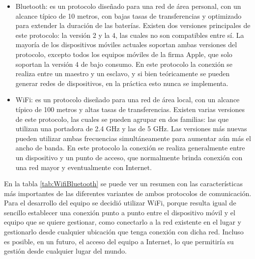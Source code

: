 \begin{itemize}
	\item Bluetooth: es un protocolo diseñado para una red de área personal, con un alcance típico de 10 metros, con bajas tasas de transferencias y optimizado para extender la duración de las baterías\cite{noauthor_bluetooth_2020}. Existen dos versiones principales de este protocolo: la versión 2 y la 4, las cuales no son compatibles entre sí. La mayoría de los dispositivos móviles actuales soportan ambas versiones del protocolo, excepto todos los equipos móviles de la firma Apple, que solo soportan la versión 4 de bajo consumo. En este protocolo la conexión se realiza entre un maestro y un esclavo, y si bien teóricamente se pueden generar redes de dispositivos, en la práctica esto nunca se implementa.
	
	\item WiFi: es un protocolo diseñado para una red de área local, con un alcance típico de 100 metros y altas tasas de transferencias\cite{noauthor_wifi_2020}. Existen varias versiones de este protocolo, las cuales se pueden agrupar en dos familias: las que utilizan una portadora de 2.4 GHz y las de 5 GHz. Las versiones más nuevas pueden utilizar ambas frecuencias simultáneamente para aumentar aún más el ancho de banda. En este protocolo la conexión se realiza generalmente entre un dispositivo y un punto de acceso, que normalmente brinda conexión con una red mayor y eventualmente con Internet.
\end{itemize}

En la tabla \ref{tab:WifiBluetooth} se puede ver un resumen con las características más importantes de las diferentes variantes de ambos protocolos de comunicación. Para el desarrollo del equipo se decidió utilizar WiFi, porque resulta igual de sencillo establecer una conexión punto a punto entre el dispositivo móvil y el equipo que se quiere gestionar, como conectarlo a la red existente en el lugar y gestionarlo desde cualquier ubicación que tenga conexión con dicha red. Incluso es posible, en un futuro, el acceso del equipo a Internet, lo que permitiría su gestión desde cualquier lugar del mundo.

